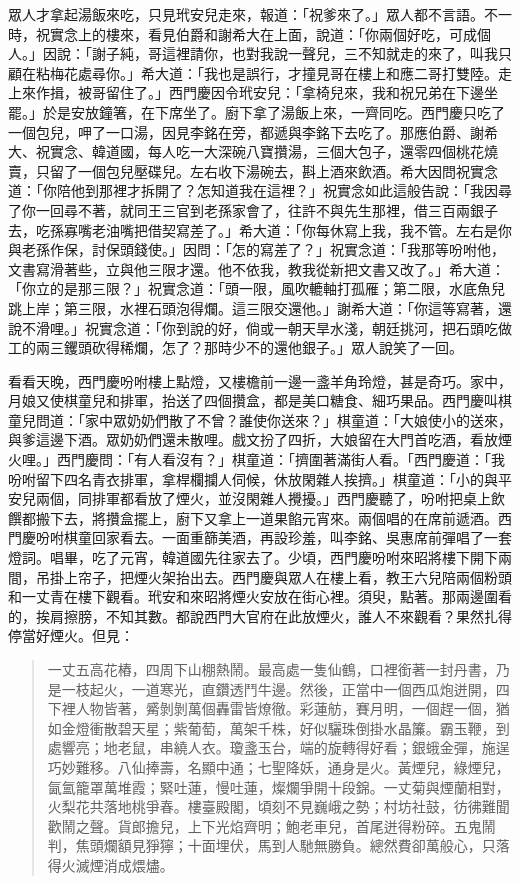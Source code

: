 眾人才拿起湯飯來吃，只見玳安兒走來，報道：「祝爹來了。」眾人都不言語。不一時，祝實念上的樓來，看見伯爵和謝希大在上面，說道：「你兩個好吃，可成個人。」因說：「謝子純，哥這裡請你，也對我說一聲兒，三不知就走的來了，叫我只顧在粘梅花處尋你。」希大道：「我也是誤行，才撞見哥在樓上和應二哥打雙陸。走上來作揖，被哥留住了。」西門慶因令玳安兒：「拿椅兒來，我和祝兄弟在下邊坐罷。」於是安放鐘箸，在下席坐了。廚下拿了湯飯上來，一齊同吃。西門慶只吃了一個包兒，呷了一口湯，因見李銘在旁，都遞與李銘下去吃了。那應伯爵、謝希大、祝實念、韓道國，每人吃一大深碗八寶攢湯，三個大包子，還零四個桃花燒賣，只留了一個包兒壓碟兒。左右收下湯碗去，斟上酒來飲酒。希大因問祝實念道：「你陪他到那裡才拆開了？怎知道我在這裡？」祝實念如此這般告說：「我因尋了你一回尋不著，就同王三官到老孫家會了，往許不與先生那裡，借三百兩銀子去，吃孫寡嘴老油嘴把借契寫差了。」希大道：「你每休寫上我，我不管。左右是你與老孫作保，討保頭錢使。」因問：「怎的寫差了？」祝實念道：「我那等吩咐他，文書寫滑著些，立與他三限才還。他不依我，教我從新把文書又改了。」希大道：「你立的是那三限？」祝實念道：「頭一限，風吹轆軸打孤雁；第二限，水底魚兒跳上岸；第三限，水裡石頭泡得爛。這三限交還他。」謝希大道：「你這等寫著，還說不滑哩。」祝實念道：「你到說的好，倘或一朝天旱水淺，朝廷挑河，把石頭吃做工的兩三钁頭砍得稀爛，怎了？那時少不的還他銀子。」眾人說笑了一回。

看看天晚，西門慶吩咐樓上點燈，又樓檐前一邊一盞羊角玲燈，甚是奇巧。家中，月娘又使棋童兒和排軍，抬送了四個攢盒，都是美口糖食、細巧果品。西門慶叫棋童兒問道：「家中眾奶奶們散了不曾？誰使你送來？」棋童道：「大娘使小的送來，與爹這邊下酒。眾奶奶們還未散哩。戲文扮了四折，大娘留在大門首吃酒，看放煙火哩。」西門慶問：「有人看沒有？」棋童道：「擠圍著滿街人看。「西門慶道：「我吩咐留下四名青衣排軍，拿桿欄攔人伺候，休放閑雜人挨擠。」棋童道：「小的與平安兒兩個，同排軍都看放了煙火，並沒閑雜人攪擾。」西門慶聽了，吩咐把桌上飲饌都搬下去，將攢盒擺上，廚下又拿上一道果餡元宵來。兩個唱的在席前遞酒。西門慶吩咐棋童回家看去。一面重篩美酒，再設珍羞，叫李銘、吳惠席前彈唱了一套燈詞。唱畢，吃了元宵，韓道國先往家去了。少頃，西門慶吩咐來昭將樓下開下兩間，吊掛上帘子，把煙火架抬出去。西門慶與眾人在樓上看，教王六兒陪兩個粉頭和一丈青在樓下觀看。玳安和來昭將煙火安放在街心裡。須臾，點著。那兩邊圍看的，挨肩擦膀，不知其數。都說西門大官府在此放煙火，誰人不來觀看？果然扎得停當好煙火。但見：
\begin{quote}
一丈五高花樁，四周下山棚熱鬧。最高處一隻仙鶴，口裡銜著一封丹書，乃是一枝起火，一道寒光，直鑽透鬥牛邊。然後，正當中一個西瓜炮迸開，四下裡人物皆著，觱剝剝萬個轟雷皆燎徹。彩蓮舫，賽月明，一個趕一個，猶如金燈衝散碧天星；紫葡萄，萬架千株，好似驪珠倒掛水晶簾。霸玉鞭，到處響亮；地老鼠，串繞人衣。瓊盞玉台，端的旋轉得好看；銀蛾金彈，施逞巧妙難移。八仙捧壽，名顯中通；七聖降妖，通身是火。黃煙兒，綠煙兒，氤氳籠罩萬堆霞；緊吐蓮，慢吐蓮，燦爛爭開十段錦。一丈菊與煙蘭相對，火梨花共落地桃爭春。樓臺殿閣，頃刻不見巍峨之勢；村坊社鼓，彷彿難聞歡鬧之聲。貨郎擔兒，上下光焰齊明；鮑老車兒，首尾迸得粉碎。五鬼鬧判，焦頭爛額見猙獰；十面埋伏，馬到人馳無勝負。總然費卻萬般心，只落得火滅煙消成煨燼。
\end{quote}

